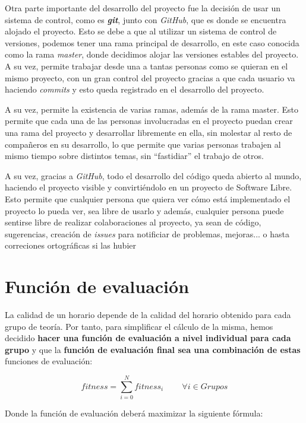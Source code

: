 Otra parte importante del desarrollo del proyecto fue la decisión de usar un sistema de control, como es \textbf{\textit{git}}, junto con \textit{GitHub}, que es donde se encuentra alojado el proyecto. Esto se debe a que al utilizar un sistema de control de versiones, podemos tener una rama principal de desarrollo, en este caso conocida como la rama \textit{master}, donde decidimos alojar las versiones estables del proyecto. A su vez, permite trabajar desde una a tantas personas como se quieran en el mismo proyecto, con un gran control del proyecto gracias a que cada usuario va haciendo \textit{commits} y esto queda registrado en el desarrollo del proyecto.

A su vez, permite la existencia de varias ramas, además de la rama master. Esto permite que cada una de las personas involucradas en el proyecto puedan crear una rama del proyecto y desarrollar libremente en ella, sin molestar al resto de compañeros en su desarrollo, lo que permite que varias personas trabajen al mismo tiempo sobre distintos temas, sin ``fastidiar'' el trabajo de otros.

A su vez, gracias a \textit{GitHub}, todo el desarrollo del código queda abierto al mundo, haciendo el proyecto visible y convirtiéndolo en un proyecto de Software Libre. Esto permite que cualquier persona que quiera ver cómo está implementado el proyecto lo pueda ver, sea libre de usarlo y además, cualquier persona puede sentirse libre de realizar colaboraciones al proyecto, ya sean de código, sugerencias, creación de \textit{issues} para notificiar de problemas, mejoras... o hasta correciones ortográficas si las hubier

\section{Función de evaluación}
La calidad de un horario depende de la calidad del horario obtenido para cada grupo de teoría. Por tanto, para simplificar el cálculo de la misma, hemos decidido \textbf{hacer una función de evaluación a nivel individual para cada grupo} y que la \textbf{función de evaluación final sea una combinación de estas} funciones de evaluación:

\begin{displaymath}
    fitness = \sum_{i=0}^N fitness_i \qquad\ \forall i \in Grupos
\end{displaymath}

Donde la función de evaluación deberá maximizar la siguiente fórmula:

